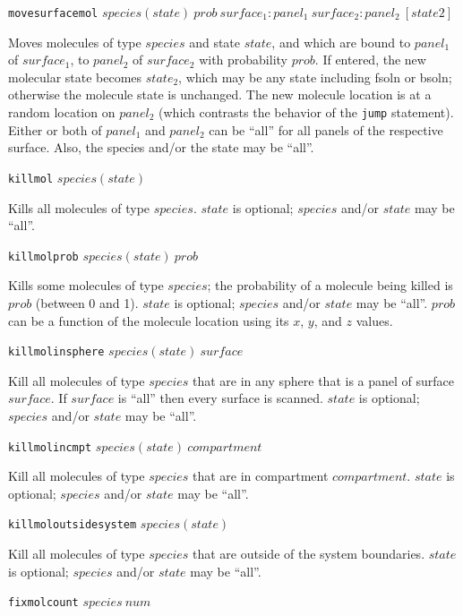 \documentclass {scrbook}
\newcommand {\ttt} {\texttt}
\begin{document}
\begin{description}
\item{\ttt{movesurfacemol} $species(state)\ prob\ surface_1:panel_1\ surface_2:panel_2\ [state2]$}

Moves molecules of type $species$ and state $state$, and which are bound to $panel_1$ of $surface_1$, to $panel_2$ of $surface_2$ with probability $prob$. If entered, the new molecular state becomes $state_2$, which may be any state including fsoln or bsoln; otherwise the molecule state is unchanged. The new molecule location is at a random location on $panel_2$ (which contrasts the behavior of the \ttt{jump} statement). Either or both of $panel_1$ and $panel_2$ can be ``all'' for all panels of the respective surface. Also, the species and/or the state may be ``all''.

\item{\ttt{killmol} $species(state)$}

Kills all molecules of type $species$. $state$ is optional; $species$ and/or $state$ may be ``all''.

\item{\ttt{killmolprob} $species(state)\ prob$}

Kills some molecules of type $species$; the probability of a molecule being killed is $prob$ (between 0 and 1). $state$ is optional; $species$ and/or $state$ may be ``all''. $prob$ can be a function of the molecule location using its $x$, $y$, and $z$ values.

\item{\ttt{killmolinsphere} $species(state)\ surface$}

Kill all molecules of type $species$ that are in any sphere that is a panel of surface $surface$. If $surface$ is ``all'' then every surface is scanned. $state$ is optional; $species$ and/or $state$ may be ``all''.

\item{\ttt{killmolincmpt} $species(state)\ compartment$}

Kill all molecules of type $species$ that are in compartment $compartment$. $state$ is optional; $species$ and/or $state$ may be ``all''.

\item{\ttt{killmoloutsidesystem} $species(state)$}

Kill all molecules of type $species$ that are outside of the system boundaries. $state$ is optional; $species$ and/or $state$ may be ``all''.

\item{\ttt{fixmolcount} $species\ num$}


\end{description}
\end{document}
